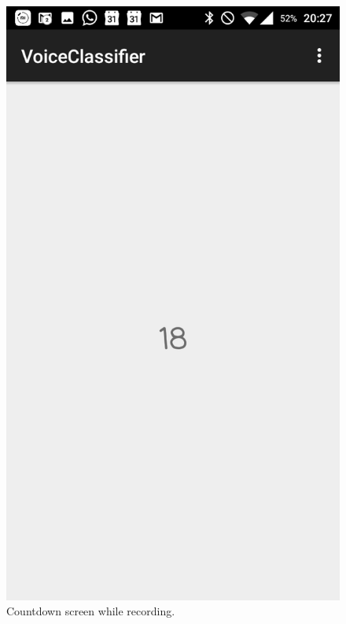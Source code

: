 \documentclass[letterpaper, 12 pt]{report}
\begin{document}
\begin{figure}[H]
\centering
  \includegraphics[width=0.45\linewidth]{Photos/Recording.png}
  \caption{Countdown screen while recording.}
\label{fig:countdown}
\end{figure}

\newpage
\end{document}
